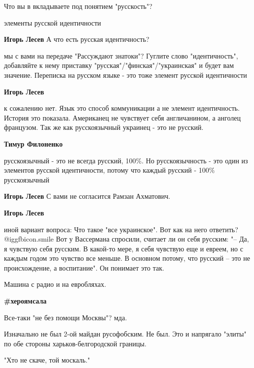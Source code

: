 \begin{itemize}
Что вы в вкладываете под понятием "русскость"?

\begin{itemize} %
элементы русской идентичности

\textbf{Игорь Лесев} А что есть русская идентичность?


мы с вами на передаче "Рассуждают знатоки"? Гуглите слово "идентичность",
добавляйте к нему приставку "русская"/"финская"/"украинская" и будет вам
значение. Переписка на русском языке - это тоже элемент русской идентичности

\textbf{Игорь Лесев} 

к сожалению нет. Язык это способ коммуникации а не элемент идентичность.
История это показала. Американец не чувствует себя англичанином, а анголец
французом. Так же как русскоязычный украинец - это не русский.

\textbf{Тимур Филоненко} 

русскоязычный - это не всегда русский, 100\%. Но русскоязычность - это один из
элементов русской идентичности, потому что каждый русский - 100\% русскоязычный

\textbf{Игорь Лесев} С вами не согласится Рамзан Ахматович.

\textbf{Игорь Лесев} 

иной вариант вопроса: Что такое "все украинское". Вот как на него ответить?
@igg{fbicon.smile} Вот у Вассермана спросили, считает ли он себя русским: "–
Да, я чувствую себя русским. В какой-то мере, я себя чувствую еще и евреем, но
с каждым годом это чувство все меньше. В основном потому, что русский – это не
происхождение, а воспитание". Он понимает это так.

\end{itemize} %

Машина с радио и на евробляхах.

\textbf{\#хероямсала}

Все-таки "не без помощи Москвы"? мда.


Изначально не был 2-ой майдан русофобским. Не был.
Это и напрягало "элиты" по обе стороны харьков-белгородской границы.

\begin{itemize} %
"Хто не скаче, той москаль."
\end{itemize} %


\end{itemize}
